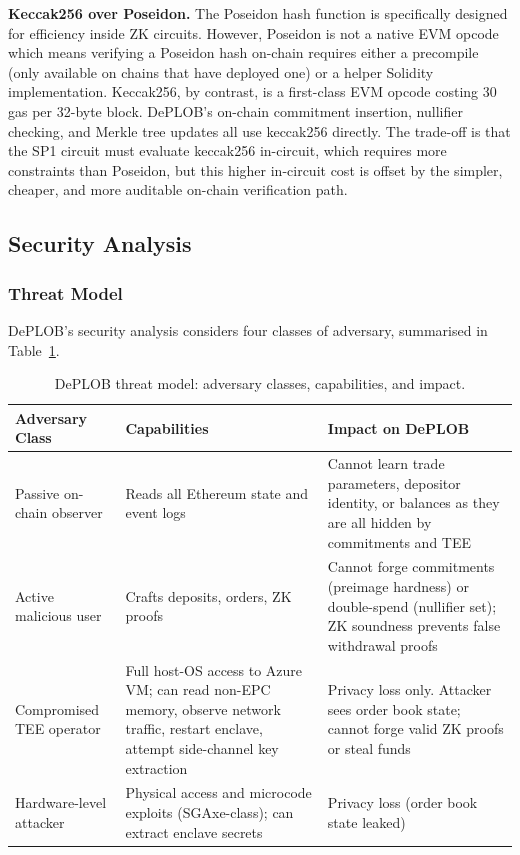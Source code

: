 \documentclass[12pt,a4paper]{article}
\begin{document}
\textbf{Keccak256 over Poseidon.} The Poseidon hash function is specifically designed for efficiency inside ZK circuits. However, Poseidon is not a native EVM opcode which means verifying a Poseidon hash on-chain requires either a precompile (only available on chains that have deployed one) or a helper Solidity implementation. Keccak256, by contrast, is a first-class EVM opcode costing 30 gas per 32-byte block. DePLOB's on-chain commitment insertion, nullifier checking, and Merkle tree updates all use keccak256 directly. The trade-off is that the SP1 circuit must evaluate keccak256 in-circuit, which requires more constraints than Poseidon, but this higher in-circuit cost is offset by the simpler, cheaper, and more auditable on-chain verification path.

\subsection{Security Analysis}

\subsubsection{Threat Model}

DePLOB's security analysis considers four classes of adversary, summarised in Table~\ref{tab:threat_model}.

\begin{table}[H]
\centering
\small
\begin{tabular}{|p{3.2cm}|p{4.8cm}|p{5.5cm}|}
\hline
\textbf{Adversary Class} & \textbf{Capabilities} & \textbf{Impact on DePLOB} \\
\hline
Passive on-chain observer & Reads all Ethereum state and event logs & Cannot learn trade parameters, depositor identity, or balances as they are all hidden by commitments and TEE \\
\hline
Active malicious user & Crafts deposits, orders, ZK proofs & Cannot forge commitments (preimage hardness) or double-spend (nullifier set); ZK soundness prevents false withdrawal proofs \\
\hline
Compromised TEE operator & Full host-OS access to Azure VM; can read non-EPC memory, observe network traffic, restart enclave, attempt side-channel key extraction & Privacy loss only. Attacker sees order book state; cannot forge valid ZK proofs or steal funds \\
\hline
Hardware-level attacker & Physical access and microcode exploits (SGAxe-class); can extract enclave secrets & Privacy loss (order book state leaked)\\
\hline
\end{tabular}
\caption{DePLOB threat model: adversary classes, capabilities, and impact.}
\label{tab:threat_model}
\end{table}
\end{document}
